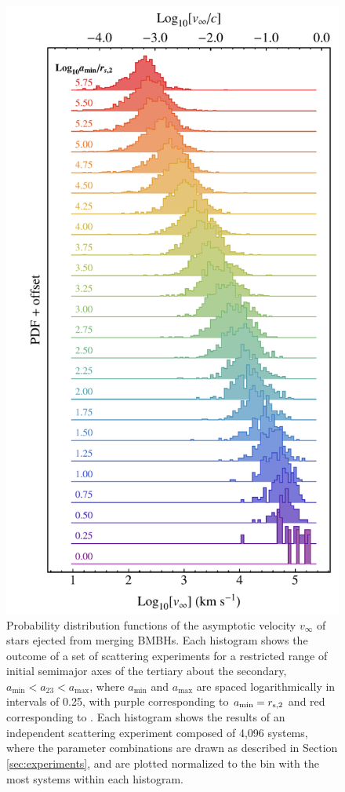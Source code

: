 \documentclass[a4paper,twocolumn]{emulateapj}
\begin{document}
\begin{figure}
\centering\includegraphics[width=0.9\linewidth,clip=true]{vinfPDF}
\caption{Probability distribution functions of the asymptotic velocity $v_{\infty}$ of stars ejected from merging BMBHs. Each histogram shows the outcome of a set of scattering experiments for a restricted range of initial semimajor axes of the tertiary about the secondary, $a_{\min} < a_{23} < a_{\max}$, where $a_{\min}$ and $a_{\max}$ are spaced logarithmically in intervals of 0.25, with purple corresponding to $a_{\min} = r_{\rm s,2}$ and red corresponding to . Each histogram shows the results of an independent scattering experiment composed of 4,096 systems, where the parameter combinations are drawn as described in Section \ref{sec:experiments}, and are plotted normalized to the bin with the most systems within each histogram.}
\label{fig:vinfpdf}
\end{figure}
\end{document}

